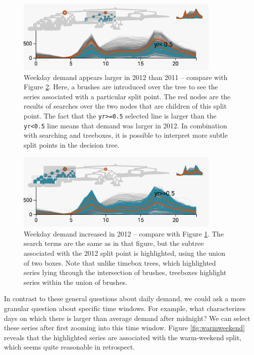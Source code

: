 \begin{figure}
  \centering
  \includegraphics[width=375px]{figure/treelapse/weekday_2011}
    \caption{Weekday demand appears larger in 2012 than 2011 -- compare with Figure 
      \ref{fig:weekday2012}. Here, a brushes are introduced over the tree to see the
      series associated with a particular split point. The red nodes are the results
      of searches over the two nodes that are children of this split point. The fact
      that the \texttt{yr>=0.5} selected line is larger than the \texttt{yr<0.5}
      line means that demand was larger in 2012. In combination with searching and
      treeboxes, it is possible to interpret more subtle split points in the decision
      tree.} \label{fig:weekday2011}
\end{figure}

\begin{figure}
  \centering
  \includegraphics[width=375px]{figure/treelapse/weekday_2012}
  \caption{Weekday demand increased in 2012 -- compare with 
    Figure \ref{fig:weekday2011}. The search terms are the same as in that figure,
    but the subtree associated with the 2012 split point is highlighted, using the
    union of two boxes. Note that unlike timebox trees, which highlighted series
    lying through the intersection of brushes, treeboxes highlight series within the
    union of brushes.}\label{fig:weekday2012}
\end{figure}

In contrast to these general questions about daily demand, we could ask
a more granular question about specific time windows. For example, what
characterizes days on which there is larger than average demand after
midnight? We can select these series after first zooming into this time window.
Figure \ref{fig:warmweekend} reveals that the highlighted series are associated
with the warm-weekend split, which seems quite reasonable in retrospect.

